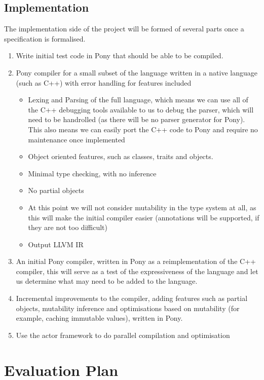 \documentclass{article}
\begin{document}
\subsection{Implementation}
The implementation side of the project will be formed of several parts once a
specification is formalised.

\begin{enumerate}
	\item Write initial test code in Pony that should be able to be compiled.
	\item Pony compiler for a small subset of the language written in a native
    language (such as C++) with error handling for features included
		\begin{itemize}
			\item Lexing and Parsing of the full language, which means we can
            use all of the C++ debugging tools available to us to debug the
            parser, which will need to be handrolled (as there will be no parser
            generator for Pony). This also means we	can easily port the C++ code
            to Pony and require no maintenance once implemented
			\item Object oriented features, such as classes, traits and
            objects.
			\item Minimal type checking, with no inference
			\item No partial objects
			\item At this point we will not consider mutability in the type
            system at all, as this will make the initial compiler easier
            (annotations will be supported, if they are not too difficult)
			\item Output LLVM IR
		\end{itemize}
	\item An initial Pony compiler, written in Pony as a reimplementation of the
    C++ compiler, this will	serve as a test of the expressiveness of the
    language and let us determine what may need	to be added to the language.
	\item Incremental improvements to the compiler, adding features such as
    partial objects, mutability inference and optimisations based on mutability
    (for example, caching immutable values), written in Pony.
    	\item Use the actor framework to do parallel compilation and optimisation
\end{enumerate}

\section{Evaluation Plan}
\end{document}

